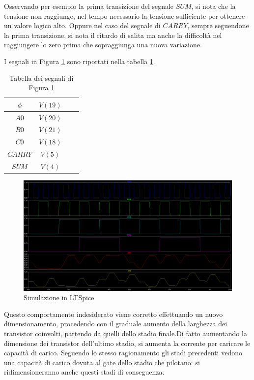 \documentclass[11pt]{article} %
\begin{document}
Osservando per esempio la prima transizione del segnale $SUM$, si nota che la tensione non raggiunge, nel tempo necessario la tensione sufficiente per ottenere un valore logico alto.
Oppure nel caso del segnale di $CARRY$, sempre seguendone la prima transizione, si nota il ritardo di salita ma anche la difficoltà nel raggiungere lo zero prima che sopraggiunga una nuova variazione.

I segnali in Figura \ref{fig:LT1}  sono riportati nella tabella  \ref{table:1}.\newline

\begin {table}

\begin{tabular}{|c|c|c|c|}
\hline
$\phi$ & $V(19)$\\
\hline
$A0$ & $V(20)$ \\
\hline
$B0$ & $V(21)$\\
\hline
$C0$ &  $V(18)$  \\
\hline
$CARRY$ & $V(5)$  \\
\hline
$SUM$ & $V(4)$ \\
\hline
\end{tabular}
\caption{Tabella dei segnali di Figura \ref{fig:LT1}}
\label{table:1}
\end{table}

\begin{figure}
  \includegraphics[width=\linewidth]{Vecchio.png}
  \caption{Simulazione in LTSpice}
  \label{fig:LT1}
\end{figure}


Questo comportamento indesiderato viene corretto effettuando un nuovo dimensionamento, procedendo con il graduale aumento della larghezza dei transistor coinvolti, partendo da quelli dello stadio finale.Di fatto aumentando la dimensione dei transistor dell'ultimo stadio, si aumenta la corrente per caricare le capacità di carico.
Seguendo lo stesso ragionamento gli stadi precedenti vedono una capacità di carico dovuta al gate dello stadio che pilotano: si ridimensioneranno anche questi stadi di conseguenza.
\end{document}
